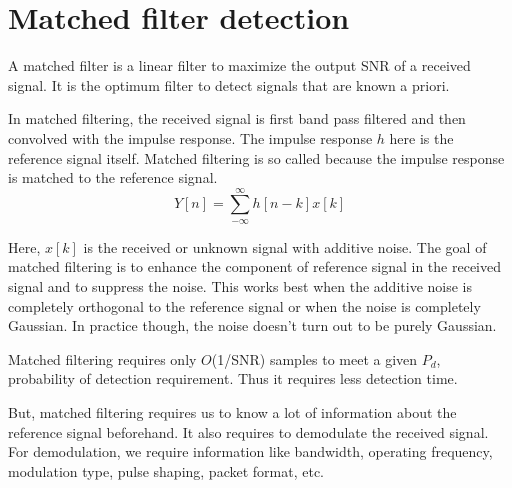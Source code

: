 \section{Matched filter detection}
A matched filter is a linear filter to maximize the output SNR of a received 
signal. It is the optimum filter to detect signals that are known a priori.

In matched filtering, the received signal is first band pass filtered and then
convolved with the impulse response. The impulse response $h$ here is the 
reference signal itself. Matched filtering is so called because the impulse 
response is matched to the reference signal.
\begin{equation*}
    Y[n] = \sum_{-\infty}^{\infty} h[n-k]x[k]
\end{equation*}

Here, $x[k]$ is the received or unknown signal with additive noise.
The goal of matched filtering is to enhance the component of reference signal
in the received signal and to suppress the noise. This works best when the 
additive noise is completely orthogonal to the reference signal or when the
noise is completely Gaussian. In practice though, the noise doesn't turn out 
to be purely Gaussian.
 
Matched filtering requires only $O$(1/SNR) samples to meet a given $P_d$, 
probability of detection requirement. Thus it requires less detection time.

But, matched filtering requires us to know a lot of information about the 
reference signal beforehand. It also requires to demodulate the received 
signal. For demodulation, we require information like bandwidth, operating 
frequency, modulation type, pulse shaping, packet
format, etc.



